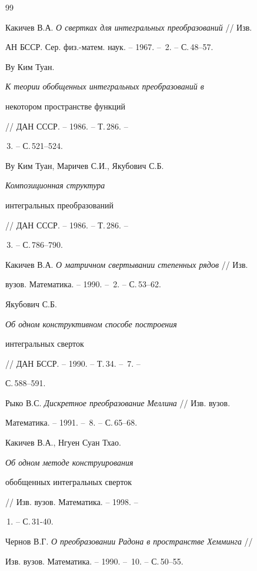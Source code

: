 \begin{thebibliography}{99} 


 




Какичев В.А. {\em О свертках для интегральных преобразований} // Изв. 


АН БССР. Сер. физ.-матем. наук. -- 1967. -- \No\,2. -- С.\,48--57. 




Ву Ким Туан. {\em К теории обобщенных интегральных преобразований в 


некотором пространстве функций} // ДАН СССР. -- 1986. -- Т.\,286. -- 


\No\,3. -- С.\,521--524. 




Ву Ким Туан, Маричев С.И., Якубович С.Б. {\em Композиционная структура 


интегральных преобразований} // ДАН СССР. -- 1986. -- Т.\,286. -- 


\No\,3. -- С.\,786--790. 




Какичев В.А. {\em О матричном свертывании степенных рядов} // Изв. 


вузов. Математика. -- 1990. -- \No\,2. -- С.\,53--62. 




Якубович С.Б. {\em Об одном конструктивном способе построения 


интегральных сверток} // ДАН БССР. -- 1990. -- Т.\,34. -- \No\,7. -- 


С.\,588--591. 




Рыко В.С. {\em Дискретное преобразование Меллина} // Изв. вузов. 


Математика. -- 1991. -- \No\,8. -- С.\,65--68. 




Какичев В.А., Нгуен Суан Тхао. {\em Об одном методе конструирования 


обобщенных интегральных сверток} // Изв. вузов. Математика. -- 1998. -- 


\No\,1. -- С.\,31-40. 




Чернов В.Г. {\em О преобразовании Радона в пространстве Хемминга} // 


Изв. вузов. Математика. -- 1990. -- \No\,10. -- С.\,50--55. 



\end{thebibliography}
